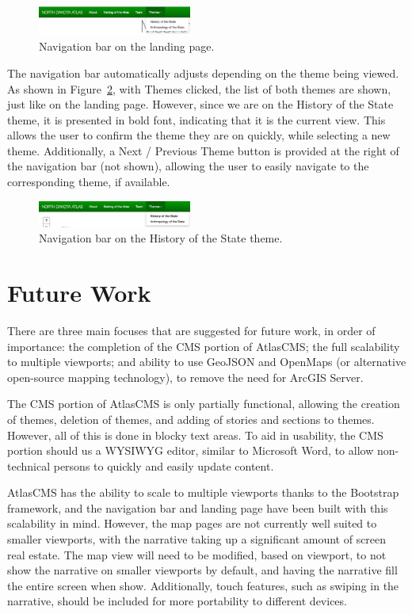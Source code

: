 \documentclass[11pt, final, conference, twocolumn]{IEEEtran}
\begin{document}
\begin{figure}[h!]
	\centering
	\includegraphics[width=0.45\textwidth]{home_themes}
	\caption{Navigation bar on the landing page.}
	\label{fig:home_themes}
\end{figure}

The navigation bar automatically adjusts depending on the theme being viewed. As shown in Figure~\ref{fig:making_themes}, with Themes clicked, the list of both themes are shown, just like on the landing page. However, since we are on the History of the State theme, it is presented in bold font, indicating that it is the current view. This allows the user to confirm the theme they are on quickly, while selecting a new theme. Additionally, a Next / Previous Theme button is provided at the right of the navigation bar (not shown), allowing the user to easily navigate to the corresponding theme, if available.

\begin{figure}[h!]
	\centering
	\includegraphics[width=0.45\textwidth]{making_themes}
	\caption{Navigation bar on the History of the State theme.}
	\label{fig:making_themes}
\end{figure}

\section{Future Work}
There are three main focuses that are suggested for future work, in order of importance: the completion of the CMS portion of AtlasCMS; the full scalability to multiple viewports; and ability to use GeoJSON and OpenMaps (or alternative open-source mapping technology), to remove the need for ArcGIS Server.

The CMS portion of AtlasCMS is only partially functional, allowing the creation of themes, deletion of themes, and adding of stories and sections to themes. However, all of this is done in blocky text areas. To aid in usability, the CMS portion should us a WYSIWYG editor, similar to Microsoft Word, to allow non-technical persons to quickly and easily update content.

AtlasCMS has the ability to scale to multiple viewports thanks to the Bootstrap framework, and the navigation bar and landing page have been built with this scalability in mind. However, the map pages are not currently well suited to smaller viewports, with the narrative taking up a significant amount of screen real estate. The map view will need to be modified, based on viewport, to not show the narrative on smaller viewports by default, and having the narrative fill the entire screen when show. Additionally, touch features, such as swiping in the narrative, should be included for more portability to different devices. 
\end{document}
